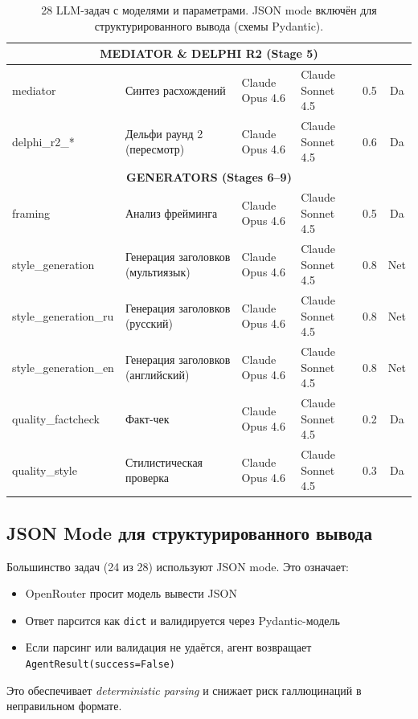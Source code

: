 \begin{table}[h]
\begin{tabular}{|l|l|l|l|c|c|}
\hline
\multicolumn{6}{|c|}{\textbf{MEDIATOR \& DELPHI R2 (Stage 5)}} \\
\hline
mediator & Синтез расхождений & Claude Opus 4.6 & Claude Sonnet 4.5 & 0.5 & Da \\
delphi\_r2\_* & Дельфи раунд 2 (пересмотр) & Claude Opus 4.6 & Claude Sonnet 4.5 & 0.6 & Da \\
\hline
\multicolumn{6}{|c|}{\textbf{GENERATORS (Stages 6–9)}} \\
\hline
framing & Анализ фрейминга & Claude Opus 4.6 & Claude Sonnet 4.5 & 0.5 & Da \\
style\_generation & Генерация заголовков (мультиязык) & Claude Opus 4.6 & Claude Sonnet 4.5 & 0.8 & Net \\
style\_generation\_ru & Генерация заголовков (русский) & Claude Opus 4.6 & Claude Sonnet 4.5 & 0.8 & Net \\
style\_generation\_en & Генерация заголовков (английский) & Claude Opus 4.6 & Claude Sonnet 4.5 & 0.8 & Net \\
quality\_factcheck & Факт-чек & Claude Opus 4.6 & Claude Sonnet 4.5 & 0.2 & Da \\
quality\_style & Стилистическая проверка & Claude Opus 4.6 & Claude Sonnet 4.5 & 0.3 & Da \\
\hline
\end{tabular}
\caption{28 LLM-задач с моделями и параметрами. JSON mode включён для структурированного вывода (схемы Pydantic).}
\label{tab:task_models}
\end{table}

\subsection{JSON Mode для структурированного вывода}


Большинство задач (24 из 28) используют JSON mode. Это означает:

\begin{itemize}[nosep]
\item OpenRouter просит модель вывести JSON
\item Ответ парсится как \texttt{dict} и валидируется через Pydantic-модель
\item Если парсинг или валидация не удаётся, агент возвращает \texttt{AgentResult(success=False)}
\end{itemize}

\noindent Это обеспечивает \emph{deterministic parsing} и снижает риск галлюцинаций в неправильном формате.



